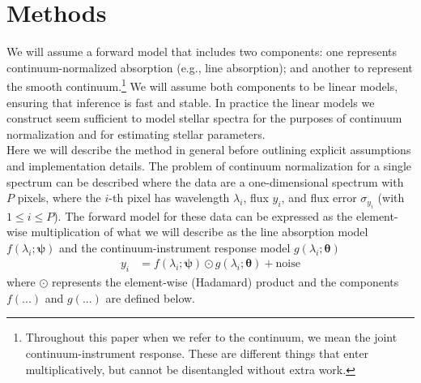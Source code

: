 \documentclass[modern]{aastex631}
\newcommand{\vectheta}{\boldsymbol{\theta}}
\newcommand{\vecpsi}{\boldsymbol{\psi}}
\newcommand{\hadamard}{\odot}
\begin{document}
\section{Methods}\label{sec:methods}

We will assume a forward model that includes two components: one represents continuum-normalized absorption (e.g., line absorption); and another to represent the smooth continuum.\footnote{Throughout this paper when we refer to the continuum, we mean the joint continuum-instrument response. These are different things that enter multiplicatively, but cannot be disentangled without extra work.} We will assume both components to be linear models, ensuring that inference is fast and stable. In practice the linear models we construct seem sufficient to model stellar spectra for the purposes of continuum normalization and for estimating stellar parameters.\\




Here we will describe the method in general before outlining explicit assumptions and implementation details. The problem of continuum normalization for a single spectrum can be described where the data are a one-dimensional spectrum with $P$ pixels, where the $i$-th pixel has wavelength $\lambda_i$, flux $y_i$, and flux error $\sigma_{y_i}$ (with $1 \leq i \leq P$). The forward model for these data can be expressed as the element-wise multiplication of what we will describe as the line absorption model $f(\lambda_i; \vecpsi)$ and the continuum-instrument response model $g(\lambda_i;\vectheta)$
\begin{align}
    y_i &= f(\lambda_i;\vecpsi)\hadamard{}g(\lambda_i;\vectheta) + \mbox{noise}
\end{align}
where $\hadamard$ represents the element-wise (Hadamard) product and the components $f(...)$ and $g(...)$ are defined below.\\
\end{document}
